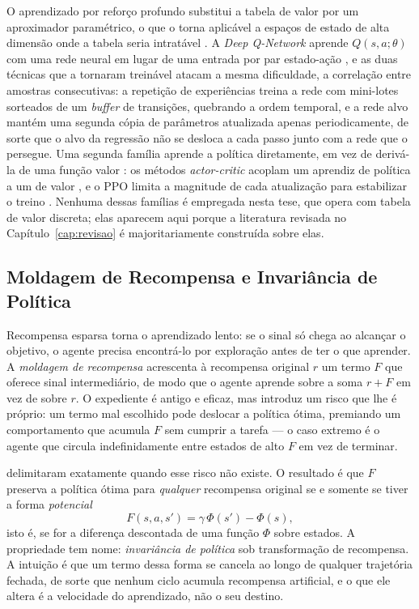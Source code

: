 O aprendizado por reforço profundo substitui a tabela de valor por um aproximador
paramétrico, o que o torna aplicável a espaços de estado de alta dimensão onde a tabela
seria intratável \cite{Arulkumaran2017DeepRL}. A \textit{Deep Q-Network} aprende
$Q(s,a;\theta)$ com uma rede neural em lugar de uma entrada por par estado-ação
\cite{Mnih2015}, e as duas técnicas que a tornaram treinável atacam a mesma dificuldade,
a correlação entre amostras consecutivas: a repetição de experiências treina a rede com
mini-lotes sorteados de um \textit{buffer} de transições, quebrando a ordem temporal, e a
rede alvo mantém uma segunda cópia de parâmetros atualizada apenas periodicamente, de
sorte que o alvo da regressão não se desloca a cada passo junto com a rede que o persegue.
Uma segunda família aprende a política diretamente, em vez de derivá-la de uma função
valor \cite{Sutton1999}: os métodos \textit{actor-critic} acoplam um aprendiz de política
a um de valor \cite{Konda1999}, e o \ac{PPO} limita a magnitude de cada atualização para
estabilizar o treino \cite{Schulman2017}. Nenhuma dessas famílias é empregada nesta tese,
que opera com tabela de valor discreta; elas aparecem aqui porque a literatura revisada no
Capítulo~\ref{cap:revisao} é majoritariamente construída sobre elas.

\subsection{Moldagem de Recompensa e Invariância de Política}
\label{sec:fund-shaping}

Recompensa esparsa torna o aprendizado lento: se o sinal só chega ao alcançar o objetivo,
o agente precisa encontrá-lo por exploração antes de ter o que aprender. A \emph{moldagem
de recompensa} acrescenta à recompensa original $r$ um termo $F$ que oferece sinal
intermediário, de modo que o agente aprende sobre a soma $r+F$ em vez de sobre $r$. O
expediente é antigo e eficaz, mas introduz um risco que lhe é próprio: um termo mal
escolhido pode deslocar a política ótima, premiando um comportamento que acumula $F$ sem
cumprir a tarefa --- o caso extremo é o agente que circula indefinidamente entre estados
de alto $F$ em vez de terminar.

 delimitaram exatamente quando esse risco não existe. O resultado é que
$F$ preserva a política ótima para \emph{qualquer} recompensa original se e somente se
tiver a forma \emph{potencial}
\begin{equation}
F(s,a,s') = \gamma\,\Phi(s') - \Phi(s),
\label{eq:fund-shaping}
\end{equation}
isto é, se for a diferença descontada de uma função $\Phi$ sobre estados. A propriedade
tem nome: \emph{invariância de política} sob transformação de recompensa. A intuição é que
um termo dessa forma se cancela ao longo de qualquer trajetória fechada, de sorte que
nenhum ciclo acumula recompensa artificial, e o que ele altera é a velocidade do
aprendizado, não o seu destino.

